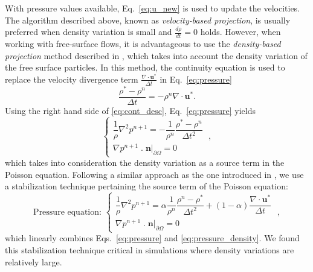 \documentclass[final,3p,times]{elsarticle}
\begin{document}
With pressure values available, Eq.~\eqref{eq:u_new} is used to update the velocities. The algorithm described above, known as \textit{velocity-based projection}, is usually preferred when density variation is small and $\frac{d\rho}{dt}=0$ holds. However, when working with free-surface flows, it is advantageous to use the \textit{density-based projection} method described in \cite{asai2012stabilized}, which takes into account the density variation of the free surface particles. In this method, the continuity equation is used to replace the velocity divergence term $\frac{\nabla\cdot \mathbf{u}^*}{\Delta t}$ in Eq.~\eqref{eq:pressure}
\begin{equation}\label{eq:cont_desc}
\dfrac{\rho^*-\rho^n}{\Delta t}=-\rho^n \nabla \cdot \mathbf{u}^*.
\end{equation}
Using the right hand side of \eqref{eq:cont_desc}, Eq.~\eqref{eq:pressure} yields
\begin{equation}\label{eq:pressure_density}
\begin{cases}
\dfrac{1}{\rho} \nabla^2 p^{n+1}=-\dfrac{1}{\rho^n}\dfrac{\rho^*-\rho^n}{\Delta t^2}\\
\nabla p^{n+1}\;.\;\mathbf{n}|_{\partial \Omega}=0
  \end{cases} \; ,
\end{equation}
which takes into consideration the density variation as a source term in the Poisson equation. Following a similar approach as the one introduced in \cite{asai2012stabilized}, we use a stabilization technique pertaining the source term of the Poisson equation:
\begin{equation}\label{eq:pressure_stab}
\text{Pressure equation:  }
\begin{cases}
  \dfrac{1}{\rho} \nabla^2 p^{n+1}=\alpha\dfrac{1}{\rho^n}\dfrac{\rho^n-\rho^*}{\Delta t^2} + (1-\alpha) \dfrac{\nabla\cdot\mathbf{u}^*}{\Delta t}\\
  \nabla p^{n+1}\;.\;\mathbf{n}|_{\partial \Omega}=0
  \end{cases} \; ,
\end{equation}
which linearly combines Eqs.~\eqref{eq:pressure} and \eqref{eq:pressure_density}. We found this stabilization technique critical in simulations where density variations are relatively large.
\end{document}
